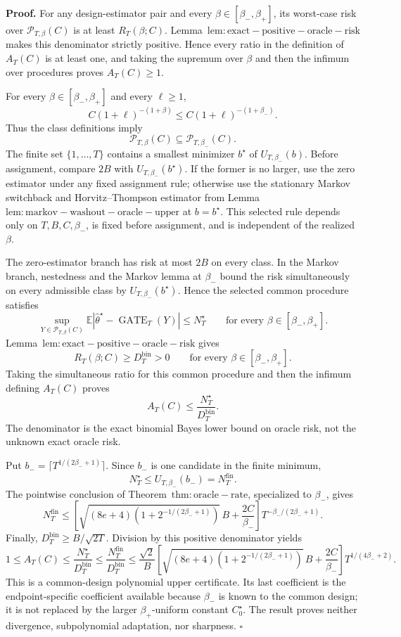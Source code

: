 \textbf{Proof.} For any design-estimator pair and every \(\beta\in[\beta_-,\beta_+]\), its worst-case risk over \(\mathcal P_{T,\beta}(C)\) is at least \(R_T(\beta;C)\). Lemma~\(\mathrm{lem:exact-positive-oracle-risk}\) makes this denominator strictly positive. Hence every ratio in the definition of \(A_T(C)\) is at least one, and taking the supremum over \(\beta\) and then the infimum over procedures proves \(A_T(C)\ge1\).

For every \(\beta\in[\beta_-,\beta_+]\) and every \(\ell\ge1\),
\[
C(1+\ell)^{-(1+\beta)}\le C(1+\ell)^{-(1+\beta_-)}.
\]
Thus the class definitions imply
\[
\mathcal P_{T,\beta}(C)\subseteq\mathcal P_{T,\beta_-}(C).
\]
The finite set \(\{1,\ldots,T\}\) contains a smallest minimizer \(b^\star\) of \(U_{T,\beta_-}(b)\). Before assignment, compare \(2B\) with \(U_{T,\beta_-}(b^\star)\). If the former is no larger, use the zero estimator under any fixed assignment rule; otherwise use the stationary Markov switchback and Horvitz--Thompson estimator from Lemma~\(\mathrm{lem:markov-washout-oracle-upper}\) at \(b=b^\star\). This selected rule depends only on \(T,B,C,\beta_-\), is fixed before assignment, and is independent of the realized \(\beta\).

The zero-estimator branch has risk at most \(2B\) on every class. In the Markov branch, nestedness and the Markov lemma at \(\beta_-\) bound the risk simultaneously on every admissible class by \(U_{T,\beta_-}(b^\star)\). Hence the selected common procedure satisfies
\[
\sup_{Y\in\mathcal P_{T,\beta}(C)}
\mathbb E\left|\widehat\theta^\star-\operatorname{GATE}_T(Y)\right|
\le N_T^\star
\qquad\text{for every }\beta\in[\beta_-,\beta_+].
\]
Lemma~\(\mathrm{lem:exact-positive-oracle-risk}\) gives
\[
R_T(\beta;C)\ge D_T^{\mathrm{bin}}>0
\qquad\text{for every }\beta\in[\beta_-,\beta_+].
\]
Taking the simultaneous ratio for this common procedure and then the infimum defining \(A_T(C)\) proves
\[
A_T(C)\le\frac{N_T^\star}{D_T^{\mathrm{bin}}}.
\]
The denominator is the exact binomial Bayes lower bound on oracle risk, not the unknown exact oracle risk.

Put \(b_-=\lceil T^{1/(2\beta_-+1)}\rceil\). Since \(b_-\) is one candidate in the finite minimum,
\[
N_T^\star\le U_{T,\beta_-}(b_-)=N_T^{\mathrm{fin}}.
\]
The pointwise conclusion of Theorem~\(\mathrm{thm:oracle-rate}\), specialized to \(\beta_-\), gives
\[
N_T^{\mathrm{fin}}
\le
\left[\sqrt{(8e+4)\left(1+2^{-1/(2\beta_-+1)}\right)}\,B+\frac{2C}{\beta_-}\right]
T^{-\beta_-/(2\beta_-+1)}.
\]
Finally, \(D_T^{\mathrm{bin}}\ge B/\sqrt{2T}\). Division by this positive denominator yields
\[
1\le A_T(C)
\le\frac{N_T^\star}{D_T^{\mathrm{bin}}}
\le\frac{N_T^{\mathrm{fin}}}{D_T^{\mathrm{bin}}}
\le\frac{\sqrt2}{B}
\left[\sqrt{(8e+4)\left(1+2^{-1/(2\beta_-+1)}\right)}\,B+\frac{2C}{\beta_-}\right]
T^{1/(4\beta_-+2)}.
\]
This is a common-design polynomial upper certificate. Its last coefficient is the endpoint-specific coefficient available because \(\beta_-\) is known to the common design; it is not replaced by the larger \(\beta_+\)-uniform constant \(C_0^\star\). The result proves neither divergence, subpolynomial adaptation, nor sharpness. \(\square\)
